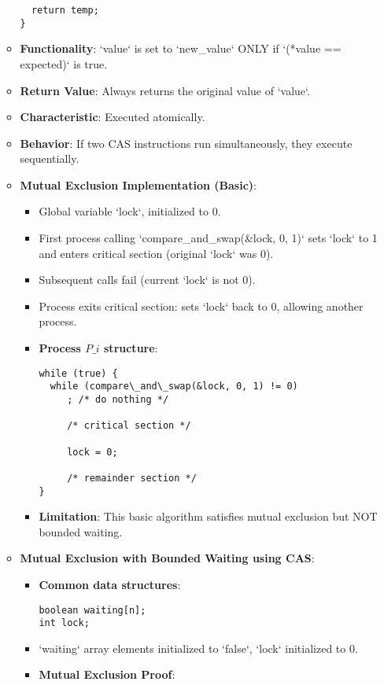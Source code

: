 \begin{itemize}
\begin{itemize}
\begin{verbatim}
  return temp;
}
\end{verbatim}
          \item \textbf{Functionality}: `value` is set to `new\_value` ONLY if `(*value == expected)` is true.
          \item \textbf{Return Value}: Always returns the original value of `value`.
          \item \textbf{Characteristic}: Executed atomically.
          \item \textbf{Behavior}: If two CAS instructions run simultaneously, they execute sequentially.
          \item \textbf{Mutual Exclusion Implementation (Basic)}:
                \begin{itemize}
                  \item Global variable `lock`, initialized to 0.
                  \item First process calling `compare\_and\_swap(\&lock, 0, 1)` sets `lock` to 1 and
                        enters critical section (original `lock` was 0).
                  \item Subsequent calls fail (current `lock` is not 0).
                  \item Process exits critical section: sets `lock` back to 0, allowing another
                        process.
                  \item \textbf{Process $P\_i$ structure}:
                        \begin{verbatim}
while (true) {
  while (compare\_and\_swap(&lock, 0, 1) != 0)
     ; /* do nothing */
 
     /* critical section */
 
     lock = 0;
 
     /* remainder section */
}
\end{verbatim}
                  \item \textbf{Limitation}: This basic algorithm satisfies mutual exclusion but NOT bounded waiting.
                \end{itemize}
          \item \textbf{Mutual Exclusion with Bounded Waiting using CAS}:
                \begin{itemize}
                  \item \textbf{Common data structures}:
                        \begin{verbatim}
boolean waiting[n];
int lock;
\end{verbatim}
                  \item `waiting` array elements initialized to `false`, `lock` initialized to 0.
                  \item \textbf{Mutual Exclusion Proof}:
                        

\end{itemize}
\end{itemize}
\end{itemize}

